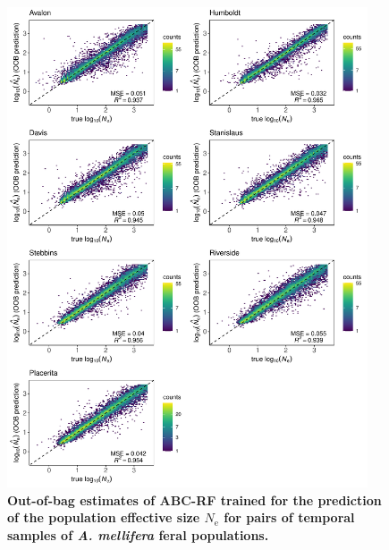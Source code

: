 \documentclass[a4paper, 12pt]{article}
\begin{document}
\begin{figure}[ht]
  \centering
  \includegraphics[width=0.95\textwidth]{Figures/FigureS14_combined_plot_ne.pdf}
  \small\caption{\textbf{Out-of-bag estimates of ABC-RF trained for the prediction of the population effective size $N_{\mathrm{e}}$ for pairs of temporal samples of \textit{A. mellifera} feral populations.}}
  \label{fig:supple_feralbee_NE}
\end{figure}
\end{document}
